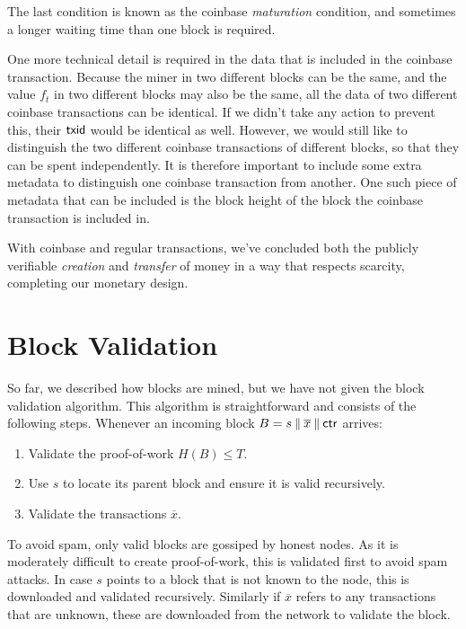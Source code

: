 The last condition is known as the coinbase \emph{maturation} condition,
and sometimes a longer waiting time than one block is required.

One more technical detail is required in the data that is included in the coinbase transaction.
Because the miner in two different blocks can be the same, and the value $f_t$ in two different
blocks may also be the same, all the data of two different coinbase transactions can be identical.
If we didn't take any action to prevent this, their $\mathsf{txid}$ would be identical as well.
However, we would still like to distinguish the two different coinbase transactions of different
blocks, so that they can be spent independently. It is therefore important to include some extra
metadata to distinguish one coinbase transaction from another. One such piece of metadata that
can be included is the block height of the block the coinbase transaction is included in.

With coinbase and regular transactions, we've concluded both the publicly verifiable \emph{creation}
and \emph{transfer} of money in a way that respects scarcity, completing our monetary design.

\section{Block Validation}

So far, we described how blocks are mined, but we have not given the block validation algorithm.
This algorithm is straightforward and consists of the following steps. Whenever an incoming
block $B = s \mathbin{\|} \overline{x} \mathbin{\|} \mathsf{ctr}$ arrives:

\begin{enumerate}
    \item Validate the proof-of-work $H(B) \leq T$.
    \item Use $s$ to locate its parent block and ensure it is valid recursively.
    \item Validate the transactions $\overline{x}$.
\end{enumerate}

To avoid spam, only valid blocks are gossiped by honest nodes. As it is moderately difficult to
create proof-of-work, this is validated first to avoid spam attacks. In case $s$ points to a block
that is not known to the node, this is downloaded and validated recursively. Similarly if
$\overline{x}$ refers to any transactions that are unknown, these are downloaded from the network
to validate the block.

